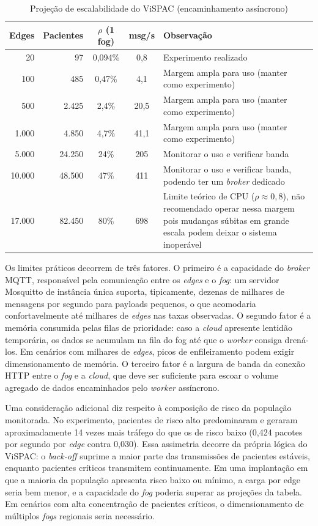 \documentclass[twoside,english,brazilian]{UNISINOSmonografia}
\begin{document}
\begin{table}[!ht]
\centering
\caption{Projeção de escalabilidade do ViSPAC (encaminhamento assíncrono)}
\label{tab:projecao}
\footnotesize
\begin{tabular}{|r|r|c|c|p{5.5cm}|}
\hline
\textbf{Edges} & \textbf{Pacientes} & \textbf{$\rho$ (1 fog)} & \textbf{msg/s} & \textbf{Observação} \\ \hline
20 & 97 & 0,094\% & 0,8 & Experimento realizado \\ \hline
100 & 485 & 0,47\% & 4,1 & Margem ampla para uso (manter como experimento) \\ \hline
500 & 2.425 & 2,4\% & 20,5 & Margem ampla para uso (manter como experimento) \\ \hline
1.000 & 4.850 & 4,7\% & 41,1 & Margem ampla para uso (manter como experimento) \\ \hline
5.000 & 24.250 & 24\% & 205 & Monitorar o uso e verificar banda \\ \hline
10.000 & 48.500 & 47\% & 411 & Monitorar o uso e verificar banda, podendo ter um \textit{broker} dedicado \\ \hline
17.000 & 82.450 & 80\% & 698 & Limite teórico de CPU ($\rho \approx 0{,}8$), não recomendado operar nessa margem pois mudanças súbitas em grande escala podem deixar o sistema inoperável \\ \hline
\end{tabular}
\end{table}

Os limites práticos decorrem de três fatores. O primeiro é a capacidade do \textit{broker} MQTT, responsável pela comunicação entre os \textit{edges} e o \textit{fog}: um servidor Mosquitto de instância única suporta, tipicamente, dezenas de milhares de mensagens por segundo para payloads pequenos, o que acomodaria confortavelmente até milhares de \textit{edges} nas taxas observadas. O segundo fator é a memória consumida pelas filas de prioridade: caso a \textit{cloud} apresente lentidão temporária, os dados se acumulam na fila do fog até que o \textit{worker} consiga drená-los. Em cenários com milhares de \textit{edges}, picos de enfileiramento podem exigir dimensionamento de memória. O terceiro fator é a largura de banda da conexão HTTP entre o \textit{fog} e a \textit{cloud}, que deve ser suficiente para escoar o volume agregado de dados encaminhados pelo \textit{worker} assíncrono.

Uma consideração adicional diz respeito à composição de risco da população monitorada. No experimento, pacientes de risco alto predominaram e geraram aproximadamente 14 vezes mais tráfego do que os de risco baixo (0,424 pacotes por segundo por \textit{edge} contra 0,030). Essa assimetria decorre da própria lógica do ViSPAC: o \textit{back-off} suprime a maior parte das transmissões de pacientes estáveis, enquanto pacientes críticos transmitem continuamente. Em uma implantação em que a maioria da população apresenta risco baixo ou mínimo, a carga por edge seria bem menor, e a capacidade do \textit{fog} poderia superar as projeções da tabela. Em cenários com alta concentração de pacientes críticos, o dimensionamento de múltiplos \textit{fogs} regionais seria necessário.
\end{document}
